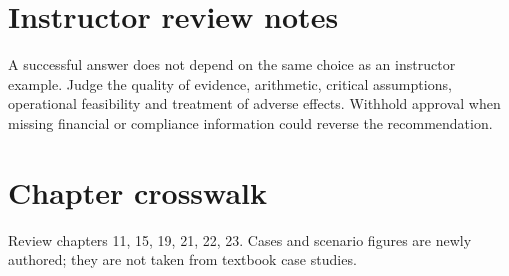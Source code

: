 \documentclass[11pt]{article}
\begin{document}
\section{Instructor review notes}
A successful answer does not depend on the same choice as an instructor example. Judge the quality of evidence, arithmetic, critical assumptions, operational feasibility and treatment of adverse effects. Withhold approval when missing financial or compliance information could reverse the recommendation.
\section{Chapter crosswalk}
Review chapters 11, 15, 19, 21, 22, 23. Cases and scenario figures are newly authored; they are not taken from textbook case studies.
\end{document}
